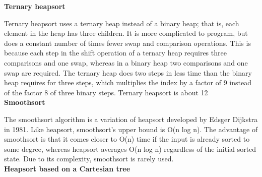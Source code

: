 \documentclass[11pt,a4paper]{article}
\begin{document}
{\begin{enumerate}[label=\textbf{\arabic*})]
					\textbf{Ternary heapsort}
					
					Ternary heapsort uses a ternary heap instead of a binary heap; that is, each element in the heap has three children. It is more complicated to program, but does a constant number of times fewer swap and comparison operations. This is because each step in the shift operation of a ternary heap requires three comparisons and one swap, whereas in a binary heap two comparisons and one swap are required. The ternary heap does two steps in less time than the binary heap requires for three steps, which multiplies the index by a factor of 9 instead of the factor 8 of three binary steps. Ternary heapsort is about 12%
					\\[9pt]
					\textbf{Smoothsort}
					
					The smoothsort algorithm is a variation of heapsort developed by Edsger Dijkstra in 1981. Like heapsort, smoothsort's upper bound is O(n log n). The advantage of smoothsort is that it comes closer to O(n) time if the input is already sorted to some degree, whereas heapsort averages O(n log n) regardless of the initial sorted state. Due to its complexity, smoothsort is rarely used.
					\\[9pt]
					\textbf{Heapsort based on a Cartesian tree}
					

\end{enumerate}}
\end{document}
